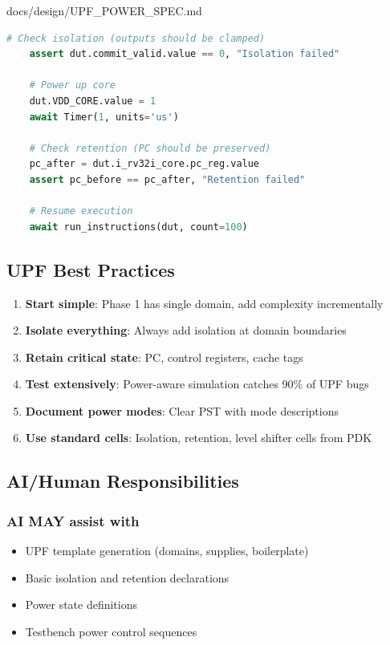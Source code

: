 \begin{relocated}{docs/design/UPF_POWER_SPEC.md}
\begin{lstlisting}[language=Python]
    # Check isolation (outputs should be clamped)
    assert dut.commit_valid.value == 0, "Isolation failed"

    # Power up core
    dut.VDD_CORE.value = 1
    await Timer(1, units='us')

    # Check retention (PC should be preserved)
    pc_after = dut.i_rv32i_core.pc_reg.value
    assert pc_before == pc_after, "Retention failed"

    # Resume execution
    await run_instructions(dut, count=100)
\end{lstlisting}

\subsection{UPF Best Practices}\label{ds:ch:upf-power-spec:upf-best-practices}

\begin{enumerate}
\def\labelenumi{\arabic{enumi}.}
\tightlist
\item
  \textbf{Start simple}: Phase 1 has single domain, add complexity
  incrementally
\item
  \textbf{Isolate everything}: Always add isolation at domain boundaries
\item
  \textbf{Retain critical state}: PC, control registers, cache tags
\item
  \textbf{Test extensively}: Power-aware simulation catches 90\% of UPF
  bugs
\item
  \textbf{Document power modes}: Clear PST with mode descriptions
\item
  \textbf{Use standard cells}: Isolation, retention, level shifter cells
  from PDK
\end{enumerate}

\subsection{AI/Human Responsibilities}\label{ds:ch:upf-power-spec:aihuman-responsibilities}

\subsubsection{AI MAY assist with}\label{ds:ch:upf-power-spec:ai-may-assist-with}

\begin{itemize}
\tightlist
\item
  UPF template generation (domains, supplies, boilerplate)
\item
  Basic isolation and retention declarations
\item
  Power state definitions
\item
  Testbench power control sequences
\end{itemize}


\end{relocated}
